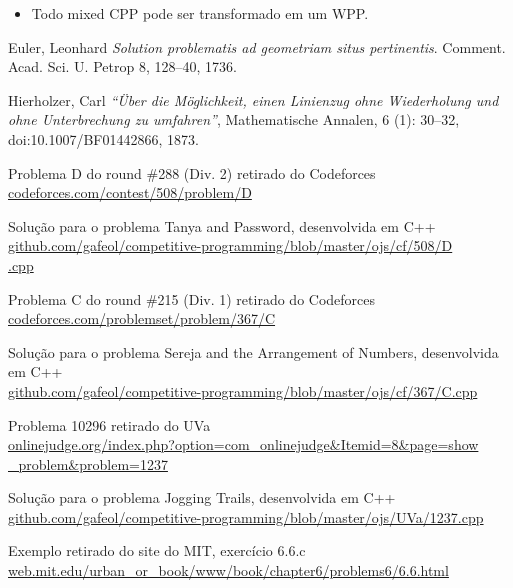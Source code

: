 \documentclass[12pt, a4paper]{article}
\begin{document}
        \begin{itemize}
            \item Todo mixed CPP pode ser transformado em um WPP.
        \end{itemize}

    \fi

	\medskip

	\begin{thebibliography}{9}
	Euler, Leonhard
	\textit{Solution problematis ad geometriam situs pertinentis}. 
	Comment. Acad. Sci. U. Petrop 8, 128–40, 1736.

	Hierholzer, Carl
	\textit{``Über die Möglichkeit, einen Linienzug ohne Wiederholung und ohne Unterbrechung zu umfahren''}, 
	Mathematische Annalen, 6 (1): 30–32, doi:10.1007/BF01442866, 1873.

    Problema D do round \#288 (Div. 2) retirado do Codeforces\\
    \href{https://codeforces.com/contest/508/problem/D}{codeforces.com/contest/508/problem/D}

    Solução para o problema Tanya and Password, desenvolvida em C++\\
    \href{https://github.com/gafeol/competitive-programming/blob/master/ojs/cf/508/D.cpp}{github.com/gafeol/competitive-programming/blob/master/ojs/cf/508/D\\.cpp}

    Problema C do round \#215 (Div. 1) retirado do Codeforces\\
    \href{https://codeforces.com/problemset/problem/367/C}{codeforces.com/problemset/problem/367/C}

    Solução para o problema Sereja and the Arrangement of Numbers, desenvolvida em C++\\
    \href{https://github.com/gafeol/competitive-programming/blob/master/ojs/cf/367/C.cpp}{github.com/gafeol/competitive-programming/blob/master/ojs/cf/367/C.cpp}

    Problema 10296 retirado do UVa\\
    \href{https://onlinejudge.org/index.php?option=com_onlinejudge&Itemid=8&page=show_problem&problem=1237}{onlinejudge.org/index.php?option=com\_onlinejudge\&Itemid=8\&page=show\\\_problem\&problem=1237}

    Solução para o problema Jogging Trails, desenvolvida em C++\\
    \href{https://github.com/gafeol/competitive-programming/blob/master/ojs/UVa/1237.cpp}{github.com/gafeol/competitive-programming/blob/master/ojs/UVa/1237.cpp} 

    Exemplo retirado do site do MIT, exercício 6.6.c\\
    \href{http://web.mit.edu/urban_or_book/www/book/chapter6/problems6/6.6.html}{web.mit.edu/urban\_or\_book/www/book/chapter6/problems6/6.6.html} 
	\end{thebibliography}
 
\end{document}
